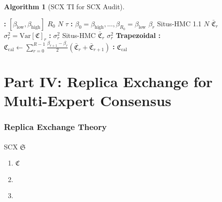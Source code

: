 \documentclass[12pt,a4paper]{article}
\theoremstyle{plain}
\theoremstyle{definition}
\newtheorem{algorithm-env}[theorem]{ Algorithm}
\newcommand{\Var}{\mathrm{Var}}
\newcommand{\Situs}{\mathfrak{S}}
\newcommand{\Cercis}{\mathfrak{C}}
\begin{document}
\begin{algorithm-env}[SCX  TI for SCX Audit]
\begin{algorithmic}[1]
\State \textbf{:}  $[\beta_{\text{low}}, \beta_{\text{high}}]$
         $R_0$ $N$ $\tau$
\State \textbf{:}  $\beta_0 = \beta_{\text{high}}, \ldots, \beta_{R_0} = \beta_{\text{low}}$
    \State  $\beta_r$  Situs-HMC 1.1 $N$ 
    \State  $\bar{\Cercis}_r$  $\sigma_r^2 = \Var[\Cercis]_r$
\EndFor
\State \textbf{:}
    \State  $\sigma_r^2$ 
    \State  Situs-HMC
    \State  $\bar{\Cercis}_r$  $\sigma_r^2$
\EndWhile
\State \textbf{Trapezoidal :}
    $\Cercis_{\text{cal}} \leftarrow \sum_{r=0}^{R-1} \frac{\beta_{r+1} - \beta_r}{2} (\bar{\Cercis}_r + \bar{\Cercis}_{r+1})$
\State \textbf{:} $\Cercis_{\text{cal}}$ 
\end{algorithmic}
\end{algorithm-env}

\newpage


\part{}
\part*{Part IV: Replica Exchange for Multi-Expert Consensus}

\section{}
\section*{Replica Exchange Theory}

\subsection{}

SCX  $\Situs$ 


\begin{enumerate}[label=(\arabic*)]
    \item \textbf{} 
         $\Cercis$ 
    \item \textbf{} 
        
    \item \textbf{} 
        
\end{enumerate}
\end{document}
